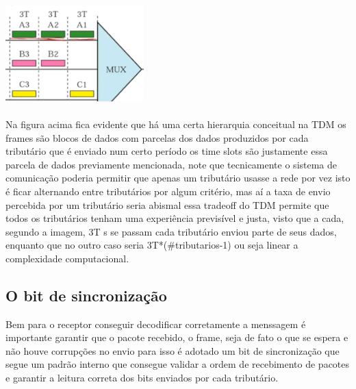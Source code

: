\includegraphics[width=0.4\textwidth]{../assets/tsl.png}
\\\\
Na figura acima fica evidente que há uma certa hierarquia conceitual na TDM os frames são blocos de dados com parcelas dos dados produzidos por cada tributário que é enviado num certo período
os time slots são justamente essa parcela de dados previamente mencionada, note que tecnicamente o sistema de comunicação poderia permitir que apenas um tributário usasse a rede por vez
isto é ficar alternando entre tributários por algum critério, mas aí a taxa de envio percebida por um tributário seria abismal essa tradeoff do TDM permite que todos os tributários tenham uma experiência
previsível e justa, visto que a cada, segundo a imagem, 3T s se passam cada tributário enviou parte de seus dados, enquanto que no outro caso seria 3T*(\#tributarios-1) ou seja
linear a complexidade computacional.

\subsection{O bit de sincronização}

Bem para o receptor conseguir decodificar corretamente a menssagem é importante garantir que o pacote recebido, o frame, seja de fato o que se espera e não houve
corrupções no envio para isso é adotado um bit de sincronização que segue um padrão interno que consegue validar a ordem de recebimento de pacotes e garantir a leitura correta
dos bits enviados por cada tributário.




